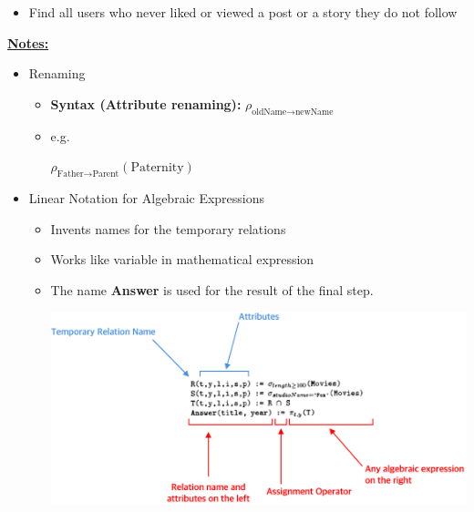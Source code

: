 \documentclass[12pt]{article}
\begin{document}
\begin{enumerate}[1.]
\begin{itemize}
        \begin{mdframed}
        \end{mdframed}

        \item Find all users who never liked or viewed a post or a story they
        do not follow

        \begin{mdframed}
        \end{mdframed}
    \end{itemize}

    \bigskip

    \underline{\textbf{Notes:}}

    \bigskip

    \begin{itemize}
        \item Renaming
        \begin{itemize}
            \item \textbf{Syntax (Attribute renaming):} $\rho_{\text{oldName} \to \text{newName}}$
            \item e.g.

            \bigskip

            $\rho_{\text{Father} \to \text{Parent}}(\text{Paternity})$
        \end{itemize}
        \item Linear Notation for Algebraic Expressions
        \begin{itemize}
            \item Invents names for the temporary relations
            \item Works like variable in mathematical expression
            \item The name \textbf{Answer} is used for the result of the final step.

            \begin{center}
            \includegraphics[width=\linewidth]{../images/assignment_1_solution_1.png}
            \end{center}
        \end{itemize}


\end{itemize}
\end{enumerate}
\end{document}
